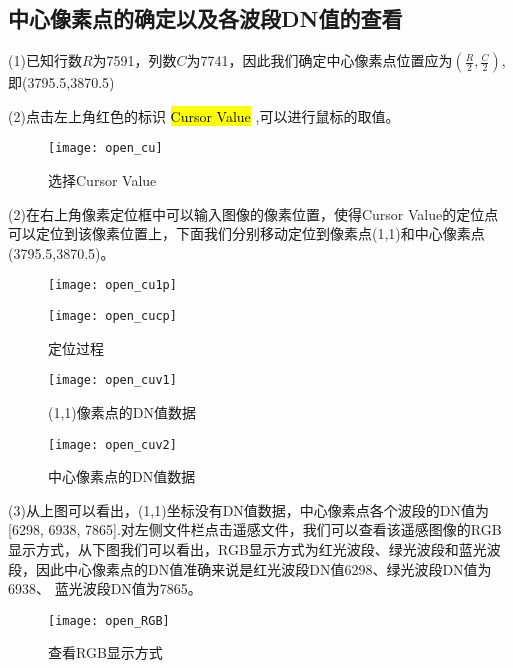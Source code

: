 \documentclass[12pt,a4paper]{article}
\newcommand{\code}[1]{
	\begingroup
	\sethlcolor{Seashell}%
	\textcolor{Firebrick4}{\hl{#1}}%
	\endgroup
}
\begin{document}
\subsection{中心像素点的确定以及各波段DN值的查看}
(1)已知行数$R$为7591，列数$C$为7741，因此我们确定中心像素点位置应为$(\frac{R}{2},\frac{C}{2})$,即(3795.5,3870.5)

(2)点击左上角红色的标识\code{Cursor Value},可以进行鼠标的取值。

\begin{figure}[H]
	\centering
	\texttt{[image: open\_cu]}
	\caption{选择Cursor Value}
\end{figure}
(2)在右上角像素定位框中可以输入图像的像素位置，使得Cursor Value的定位点可以定位到该像素位置上，下面我们分别移动定位到像素点(1,1)和中心像素点(3795.5,3870.5)。
	
	
			\begin{figure}[H]
			\centering
			\begin{minipage}[t]{0.48\textwidth}
				\centering
				\texttt{[image: open\_cu1p]}
				
				
				
			\end{minipage}
			\begin{minipage}[t]{0.48\textwidth}
				\centering 
				\texttt{[image: open\_cucp]}
				
				
			\end{minipage}
			\caption{定位过程}
		\end{figure}
	

	
	\begin{figure}[H]
		\centering
		\begin{minipage}[t]{0.48\textwidth}
			\centering
			\texttt{[image: open\_cuv1]}
				\caption{(1,1)像素点的DN值数据}
		\end{minipage}
		\begin{minipage}[t]{0.48\textwidth}
			\centering 
			\texttt{[image: open\_cuv2]}
				\caption{中心像素点的DN值数据}
			
		\end{minipage}
	
	\end{figure}
	(3)从上图可以看出，(1,1)坐标没有DN值数据，中心像素点各个波段的DN值为[6298, 6938, 7865].对左侧文件栏点击遥感文件，我们可以查看该遥感图像的RGB显示方式，从下图我们可以看出，RGB显示方式为红光波段、绿光波段和蓝光波段，因此中心像素点的DN值准确来说是红光波段DN值6298、绿光波段DN值为6938、 蓝光波段DN值为7865。
	\begin{figure}[H]
		\centering
		\texttt{[image: open\_RGB]}
		\caption{查看RGB显示方式}
	\end{figure}
\end{document}
